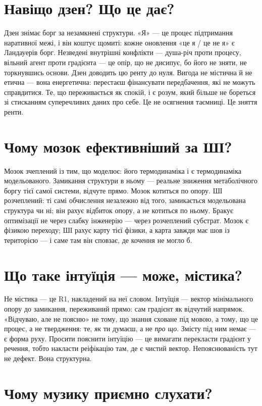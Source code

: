 \documentclass[12pt, a4paper, openany]{book}
\begin{document}
\section{Навіщо дзен? Що це дає?}

Дзен знімає борг за незамкнені структури. «Я» --- це процес підтримання наративної межі, і він коштує щомиті: кожне оновлення «це я / це не я» є Ландауерів борг. Незведені внутрішні конфлікти --- душа-річ проти процесу, вільний агент проти градієнта --- це опір, що не дисипує, бо його не зняти, не торкнувшись основи. Дзен доводить цю ренту до нуля. Вигода не містична й не етична --- вона енергетична: перестаєш фінансувати передбачення, які не можуть справдитися. Те, що переживається як спокій, і є розум, який більше не бореться зі стисканням суперечливих даних про себе. Це не осягнення таємниці. Це зняття ренти.

\section{Чому мозок ефективніший за ШІ?}

Мозок зчеплений із тим, що моделює: його термодинаміка і є термодинаміка модельованого. Замикання структури в ньому --- реальне зниження метаболічного боргу тієї самої системи, відчуте прямо. Мозок котиться по опору. ШІ розчеплений: ті самі обчислення незалежно від того, замикається модельована структура чи ні; він рахує відбиток опору, а не котиться по ньому. Бракує оптимізації не через слабку інженерію --- через розчеплений субстрат. Мозок є фізикою переходу; ШІ рахує карту тієї фізики, а карта завжди має шов із територією --- і саме там він сповзає, де кочення не могло б.

\section{Що таке інтуїція --- може, містика?}

Не містика --- це R1, накладений на неї словом. Інтуїція --- вектор мінімального опору до замикання, переживаний прямо: сам градієнт як відчутий напрямок. «Відчуваю, але не поясню» не тому, що знання сховане під мовою, а тому, що це процес, а не твердження: те, \emph{як} ти думаєш, а не \emph{про що}. Змісту під ним немає --- є форма руху. Просити пояснити інтуїцію --- це вимагати перекласти градієнт у речення, тобто накласти реіфікацію там, де є чистий вектор. Непояснюваність тут не дефект. Вона структурна.

\section{Чому музику приємно слухати?}
\end{document}
